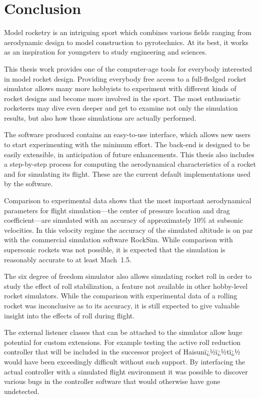 

\chapter{Conclusion}
\label{chap-conclusion}


Model rocketry is an intriguing sport which combines various fields
ranging from aerodynamic design to model construction to
pyrotechnics.  At its best, it works as an inspiration for youngsters
to study engineering and sciences.

This thesis work provides one of the computer-age tools for everybody
interested in model rocket design.  Providing everybody free access to
a full-fledged rocket simulator allows many more hobbyists to
experiment with different kinds of rocket designs and become more
involved in the sport.  The most enthusiastic rocketeers may dive
even deeper and get to examine not only the simulation results, but
also how those simulations are actually performed.

The software produced contains an easy-to-use interface, which allows
new users to start experimenting with the minimum effort.  The
back-end is designed to be easily extensible, in anticipation of
future enhancements.  This thesis also includes a step-by-step process
for computing the aerodynamical characteristics of a rocket and for
simulating its flight.  These are the current default implementations
used by the software.

Comparison to experimental data shows that the most important
aerodynamical parameters for flight simulation---the center of
pressure location and drag coefficient---are simulated with an
accuracy of approximately 10\% at subsonic velocities.  In this
velocity regime the accuracy of the simulated altitude is on par with
the commercial simulation software RockSim.  While comparison with
supersonic rockets was not possible, it is expected that the
simulation is reasonably accurate to at least Mach~1.5.

The six degree of freedom simulator also allows simulating rocket roll
in order to study the effect of roll stabilization, a feature
not available in other hobby-level rocket simulators.  While the
comparison with experimental data of a rolling rocket was
inconclusive as to its accuracy, it is still expected to give valuable
insight into the effects of roll during flight.

The external listener classes that can be attached to the simulator
allow huge potential for custom extensions.  For example testing the
active roll reduction controller that will be included in the
successor project of Haisunï¿½ï¿½tï¿½ would have been exceedingly difficult
without such support.  By interfacing the actual controller with a
simulated flight environment it was possible to discover various bugs
in the controller software that would otherwise have gone undetected.


